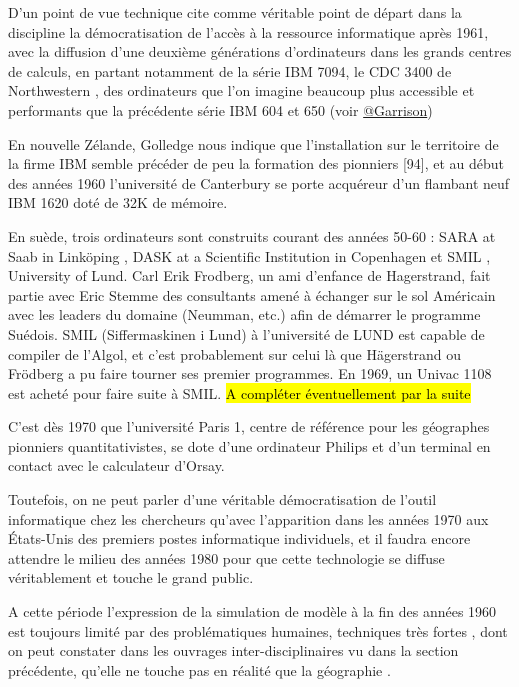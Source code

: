 D'un point de vue technique \textcite{Haggett1969} cite comme véritable point de départ dans la discipline la  démocratisation de l'accès à la ressource informatique après 1961, avec la diffusion d'une deuxième générations d'ordinateurs dans les grands centres de calculs, en partant notamment de la série IBM 7094, le CDC 3400 de Northwestern \autocite[3]{Marble1967}, des ordinateurs que l'on imagine beaucoup plus accessible et performants que la précédente série IBM 604 et 650 (voir \href{http://www.aag.org/cs/garrison}{@Garrison})

En nouvelle Zélande, Golledge nous indique que l'installation sur le territoire de la firme IBM semble précéder de peu la formation des pionniers [94]\autocite{Bailly2000}, et au début des années 1960 l'université de Canterbury se porte acquéreur d'un flambant neuf IBM 1620 doté de 32K de mémoire.

En suède, trois ordinateurs sont construits courant des années 50-60 :  SARA at Saab in Linköping , DASK at a Scientific Institution in Copenhagen et SMIL , University of Lund. \autocite{Persson} Carl Erik Frodberg, un ami d'enfance de Hagerstrand, fait partie avec Eric Stemme des consultants amené à échanger sur le sol Américain avec les leaders du domaine (Neumman, etc.) afin de démarrer le programme Suédois. SMIL (Siffermaskinen i Lund) à l'université de LUND est capable de compiler de l'Algol, et c'est probablement sur celui là que Hägerstrand ou Frödberg a pu faire tourner ses premier programmes. En 1969, un Univac 1108 est acheté pour faire suite à SMIL. \hl{A compléter éventuellement par la suite}

C'est dès 1970 que l'université Paris 1, centre de référence pour les géographes pionniers quantitativistes, se dote d'une ordinateur Philips et d'un terminal en contact avec le calculateur d'Orsay.

Toutefois, on ne peut parler d'une véritable démocratisation de l'outil informatique chez les chercheurs qu'avec l'apparition dans les années 1970 aux États-Unis des premiers postes informatique individuels, et il faudra encore attendre le milieu des années 1980 pour que cette technologie se diffuse véritablement et touche le grand public.

A cette période l'expression de la simulation de modèle à la fin des années 1960 est toujours limité par des problématiques humaines, techniques très fortes \autocite{Haggett1969} \autocite[387]{Marble1972}, dont on peut constater dans les ouvrages inter-disciplinaires vu dans la section précédente, qu'elle ne touche pas en réalité que la géographie \autocite{Guetzkow1972}. 


